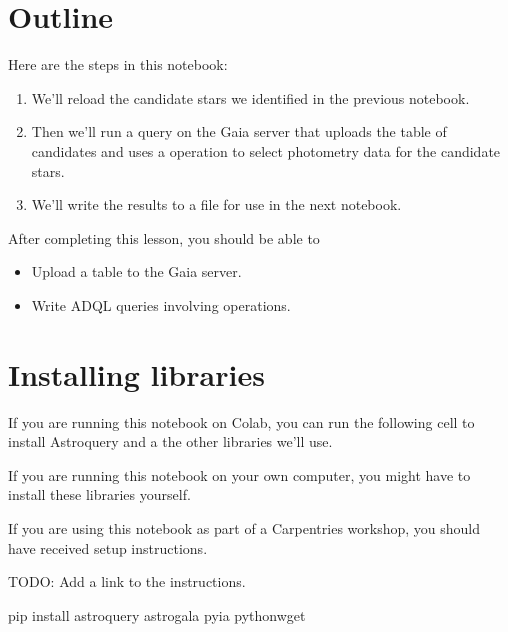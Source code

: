 \documentclass[letterpaper,10pt,english]{sphinxmanual}
\begin{document}
\section{Outline}
\label{\detokenize{05_join:outline}}
Here are the steps in this notebook:
\begin{enumerate}
%
\item {} 
We’ll reload the candidate stars we identified in the previous notebook.

\item {} 
Then we’ll run a query on the Gaia server that uploads the table of candidates and uses a  operation to select photometry data for the candidate stars.

\item {} 
We’ll write the results to a file for use in the next notebook.

\end{enumerate}

After completing this lesson, you should be able to
\begin{itemize}
\item {} 
Upload a table to the Gaia server.

\item {} 
Write ADQL queries involving  operations.

\end{itemize}


\section{Installing libraries}
\label{\detokenize{05_join:installing-libraries}}
If you are running this notebook on Colab, you can run the following cell to install Astroquery and a the other libraries we’ll use.

If you are running this notebook on your own computer, you might have to install these libraries yourself.

If you are using this notebook as part of a Carpentries workshop, you should have received setup instructions.

TODO: Add a link to the instructions.

\begin{sphinxVerbatim}[commandchars=\\\{\}]

 
    

 
    pip install astroquery astro\PYGZhy{}gala pyia python\PYGZhy{}wget
\end{sphinxVerbatim}
\end{document}
